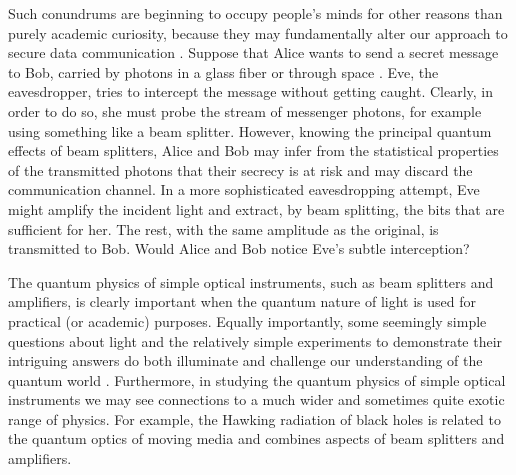 \documentclass[12pt,amsmath,amssymb]{article}
\numberwithin{equation}{section}
\begin{document}
Such conundrums are beginning to occupy people's minds for other reasons
than purely academic curiosity, because they may fundamentally alter
our approach to secure data communication \cite{Bruss,Gisin}.
Suppose that Alice wants to send a secret message to Bob,
carried by photons in a glass fiber \cite{Tittel} or through space \cite{Kurtsiefer}.
Eve, the eavesdropper, tries to intercept the message without getting caught.
Clearly, in order to do so, she must probe the stream of messenger photons,
for example using something like a beam splitter.
However, knowing the principal quantum effects of beam splitters,
Alice and Bob may infer from the statistical properties of the transmitted photons
that their secrecy is at risk and may discard the communication channel.
In a more sophisticated eavesdropping attempt,
Eve might amplify the incident light and extract,
by beam splitting, the bits that are sufficient for her.
The rest, with the same amplitude as the original, is transmitted to Bob.
Would Alice and Bob notice Eve's subtle interception?

The quantum physics of simple optical instruments, such as beam splitters
and amplifiers, is clearly important when the quantum nature of light
is used for practical (or academic) purposes.
Equally importantly, some seemingly simple questions about light and
the relatively simple experiments to demonstrate their intriguing answers
do both illuminate and challenge our understanding of the quantum world
\cite{Paul}.
Furthermore, in studying the quantum physics of simple optical instruments
we may see connections to a much wider and sometimes quite exotic
range of physics.
For example, the Hawking radiation of black holes \cite{Hawking1}
is related to the quantum optics of moving media and
combines aspects of beam splitters and amplifiers.
\end{document}
